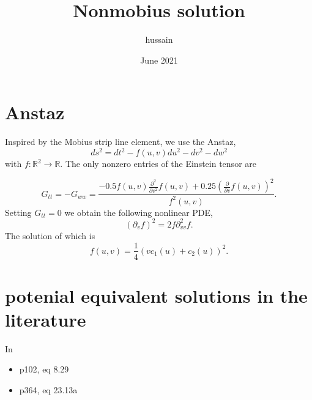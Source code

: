 \documentclass{article}
\title{Nonmobius solution}
\author{hussain}
\date{June 2021}
\begin{document}
\maketitle

\section{Anstaz}
Inspired by the Mobius strip line element, we use the Anstaz,
\[
ds^2 = dt^2 - f(u, v)du^2 - dv^2 -dw^2
\]
with $f:\mathbb R^2 \longrightarrow \mathbb R.$ The only nonzero entries of the Einstein tensor are

\[
G_{tt} = -G_{ww} = \frac{- 0.5 f{\left(u,v \right)} \frac{\partial^{2}}{\partial v^{2}} f{\left(u,v \right)} + 0.25 \left(\frac{\partial}{\partial v} f{\left(u,v \right)}\right)^{2}}{f^{2}{\left(u,v \right)}}.
\]
Setting $G_{tt}=0$ we obtain the following nonlinear PDE,
\[
(\partial_v f)^2 = 2f\partial_{vv}^2f.    
\]
The solution of which is 
\[
f(u, v) = \frac{1}{4}(vc_1(u) + c_2(u))^2.
\]
\section{potenial equivalent solutions in the literature}
In \cite{stephani}
\begin{itemize}
    \item p102, eq 8.29
    \item p364, eq 23.13a
\end{itemize}


\typeout{}



    
\end{document}
